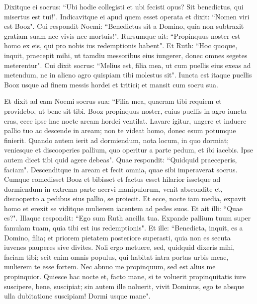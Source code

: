 \begin{biblechapter}
\verse Dixitque ei socrus: “Ubi hodie collegisti et ubi fecisti opus? Sit benedictus, qui misertus est tui!". Indicavitque ei apud quem esset operata et dixit: “Nomen viri est Booz". 
\verse Cui respondit Noemi: “Benedictus sit a Domino, quia non subtraxit gratiam suam nec vivis nec mortuis!". Rursumque ait: “Propinquus noster est homo ex eis, qui pro nobis ius redemptionis habent".  
\verse Et Ruth: “Hoc quoque, inquit, praecepit mihi, ut tamdiu messoribus eius iungerer, donec omnes segetes meterentur". 
\verse Cui dixit socrus: “Melius est, filia mea, ut cum puellis eius exeas ad metendum, ne in alieno agro quispiam tibi molestus sit". 
\verse Iuncta est itaque puellis Booz usque ad finem messis hordei et tritici; et mansit cum socru sua. 
\end{biblechapter}

\begin{biblechapter}  
\verse Et dixit ad eam Noemi socrus sua: “Filia mea, quaeram tibi requiem et providebo, ut bene sit tibi. 
\verse Booz propinquus noster, cuius puellis in agro iuncta eras, ecce ipse hac nocte aream hordei ventilat. 
\verse Lavare igitur, ungere et induere pallio tuo ac descende in aream; non te videat homo, donec esum potumque finierit. 
\verse Quando autem ierit ad dormiendum, nota locum, in quo dormiat; veniesque et discooperies pallium, quo operitur a parte pedum, et ibi iacebis. Ipse autem dicet tibi quid agere debeas". 
\verse Quae respondit: “Quidquid praeceperis, faciam". 
\verse Descenditque in aream et fecit omnia, quae sibi imperaverat socrus. 
\verse Cumque comedisset Booz et bibisset et factus esset hilarior issetque ad dormiendum in extrema parte acervi manipulorum, venit abscondite et, discooperto a pedibus eius pallio, se proiecit. 
\verse Et ecce, nocte iam media, expavit homo et erexit se viditque mulierem iacentem ad pedes suos. 
\verse Et ait illi: “Quae es?". Illaque respondit: “Ego sum Ruth ancilla tua. Expande pallium tuum super famulam tuam, quia tibi est ius redemptionis". 
\verse Et ille: “Benedicta, inquit, es a Domino, filia; et priorem pietatem posteriore superasti, quia non es secuta iuvenes pauperes sive divites. 
\verse Noli ergo metuere, sed, quidquid dixeris mihi, faciam tibi; scit enim omnis populus, qui habitat intra portas urbis meae, mulierem te esse fortem. 
\verse Nec abnuo me propinquum, sed est alius me propinquior. 
\verse Quiesce hac nocte et, facto mane, si te voluerit propinquitatis iure suscipere, bene, suscipiat; sin autem ille noluerit, vivit Dominus, ego te absque ulla dubitatione suscipiam! Dormi usque mane". 

\end{biblechapter}
